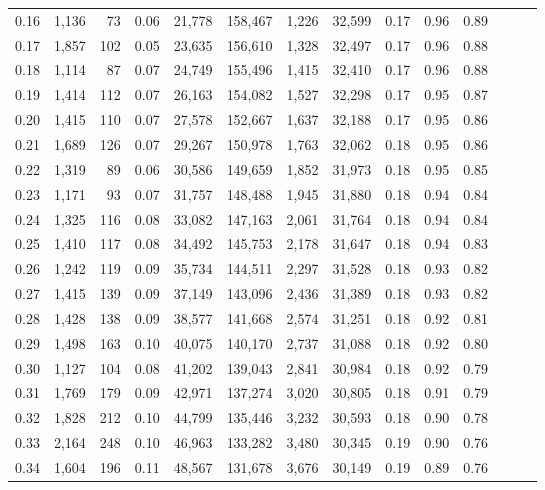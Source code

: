 \begin{tabular}{rrrrrrrrrrrrrr}
0.16 &  1,136 &   73 &  0.06 &   21,778 &  158,467 &   1,226 &  32,599 &  0.17 &  0.96 &      0.89 \\
0.17 &  1,857 &  102 &  0.05 &   23,635 &  156,610 &   1,328 &  32,497 &  0.17 &  0.96 &      0.88 \\
0.18 &  1,114 &   87 &  0.07 &   24,749 &  155,496 &   1,415 &  32,410 &  0.17 &  0.96 &      0.88 \\
0.19 &  1,414 &  112 &  0.07 &   26,163 &  154,082 &   1,527 &  32,298 &  0.17 &  0.95 &      0.87 \\
0.20 &  1,415 &  110 &  0.07 &   27,578 &  152,667 &   1,637 &  32,188 &  0.17 &  0.95 &      0.86 \\
0.21 &  1,689 &  126 &  0.07 &   29,267 &  150,978 &   1,763 &  32,062 &  0.18 &  0.95 &      0.86 \\
0.22 &  1,319 &   89 &  0.06 &   30,586 &  149,659 &   1,852 &  31,973 &  0.18 &  0.95 &      0.85 \\
0.23 &  1,171 &   93 &  0.07 &   31,757 &  148,488 &   1,945 &  31,880 &  0.18 &  0.94 &      0.84 \\
0.24 &  1,325 &  116 &  0.08 &   33,082 &  147,163 &   2,061 &  31,764 &  0.18 &  0.94 &      0.84 \\
0.25 &  1,410 &  117 &  0.08 &   34,492 &  145,753 &   2,178 &  31,647 &  0.18 &  0.94 &      0.83 \\
0.26 &  1,242 &  119 &  0.09 &   35,734 &  144,511 &   2,297 &  31,528 &  0.18 &  0.93 &      0.82 \\
0.27 &  1,415 &  139 &  0.09 &   37,149 &  143,096 &   2,436 &  31,389 &  0.18 &  0.93 &      0.82 \\
0.28 &  1,428 &  138 &  0.09 &   38,577 &  141,668 &   2,574 &  31,251 &  0.18 &  0.92 &      0.81 \\
0.29 &  1,498 &  163 &  0.10 &   40,075 &  140,170 &   2,737 &  31,088 &  0.18 &  0.92 &      0.80 \\
0.30 &  1,127 &  104 &  0.08 &   41,202 &  139,043 &   2,841 &  30,984 &  0.18 &  0.92 &      0.79 \\
0.31 &  1,769 &  179 &  0.09 &   42,971 &  137,274 &   3,020 &  30,805 &  0.18 &  0.91 &      0.79 \\
0.32 &  1,828 &  212 &  0.10 &   44,799 &  135,446 &   3,232 &  30,593 &  0.18 &  0.90 &      0.78 \\
0.33 &  2,164 &  248 &  0.10 &   46,963 &  133,282 &   3,480 &  30,345 &  0.19 &  0.90 &      0.76 \\
0.34 &  1,604 &  196 &  0.11 &   48,567 &  131,678 &   3,676 &  30,149 &  0.19 &  0.89 &      0.76 \\

\end{tabular}
